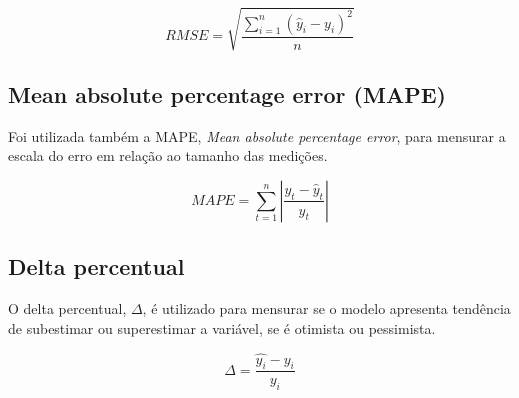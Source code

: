     \begin{equation}
        RMSE = \sqrt{\frac{\sum_{i=1}^n (\hat{y}_i - y_i)^2}{n}}
    \end{equation}

\subsection{Mean absolute percentage error (MAPE)}

    Foi utilizada também a MAPE, \textit{Mean absolute
    percentage error}, para mensurar a escala do erro em 
    relação ao tamanho das medições.

    \begin{equation}
        MAPE=\sum_{t=1}^n\left|\frac{y_t-\hat{y}_t}{y_t}\right|
    \end{equation}

\subsection{Delta percentual}

O delta percentual, $\Delta$, é utilizado para mensurar se o 
modelo apresenta tendência de subestimar ou superestimar a variável, se 
é otimista ou pessimista.

\begin{equation}
    \Delta = \frac{\hat{y_i} - y_i}{y_i}
\end{equation}